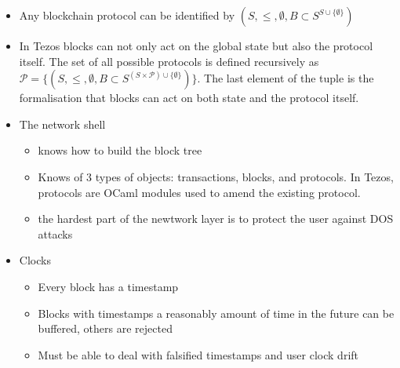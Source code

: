 \documentclass[a4paper]{article}
\begin{document}
\begin{itemize}
\item Any blockchain protocol can be identified by $(S, \leq, \emptyset, B \subset S^{S \cup \{\emptyset\}})$

\item In Tezos blocks can not only act on the global state but also the protocol itself. The set of all possible protocols is defined recursively as $\mathcal{P}=\{(S, \leq, \emptyset, B \subset S^{(S \times \mathcal{P}) \cup \{\emptyset\}})\}$. The last element of the tuple is the formalisation that blocks can act on both state and the protocol itself.

\item The network shell
\begin{itemize}
\item knows how to build the block tree
\item Knows of 3 types of objects: transactions, blocks, and protocols. In Tezos, protocols are OCaml modules used to amend the existing protocol.
\item the hardest part of the newtwork layer is to protect the user against DOS attacks
\end{itemize}

\item Clocks
\begin{itemize}
\item Every block has a timestamp
\item Blocks with timestamps a reasonably amount of time in the future can be buffered, others are rejected
\item Must be able to deal with falsified timestamps and user clock drift
\end{itemize}


\end{itemize}
\end{document}
